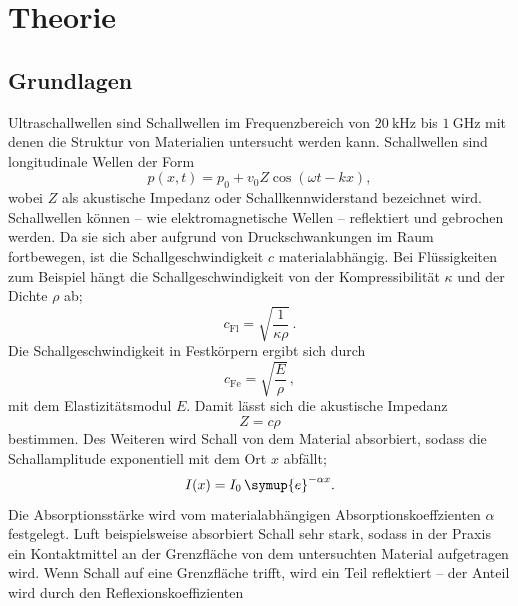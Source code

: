\section{Theorie}
\label{sec:Theorie}
\subsection{Grundlagen}
Ultraschallwellen sind Schallwellen im Frequenzbereich von $\SI{20}{\kilo\hertz}$ bis
$\SI{1}{\giga\hertz}$ mit denen die Struktur von Materialien untersucht werden kann.
Schallwellen sind longitudinale Wellen der Form
\begin{equation}
	p(x,t) = p_0 + v_0 Z \cos(\omega t - kx) \mathrm{,}
\end{equation}
wobei $Z$ als akustische Impedanz oder Schallkennwiderstand bezeichnet wird.
Schallwellen können -- wie elektromagnetische Wellen -- reflektiert und gebrochen werden.
Da sie sich aber aufgrund von Druckschwankungen im Raum fortbewegen, ist die
Schallgeschwindigkeit $c$ materialabhängig. Bei Flüssigkeiten zum Beispiel hängt die
Schallgeschwindigkeit von der Kompressibilität $\kappa$ und der Dichte $\rho$ ab;
\begin{equation}
	c_{\mathrm{Fl}} = \sqrt{\frac{1}{\kappa\rho}} \, \mathrm{.}
\end{equation}
Die Schallgeschwindigkeit in Festkörpern ergibt sich durch
\begin{equation}
	c_{\mathrm{Fe}} = \sqrt{\frac{E}{\rho}} \, \mathrm{,}
\end{equation}
mit dem Elastizitätsmodul $E$.
Damit lässt sich die akustische Impedanz
\begin{equation}
	Z=c \rho
\end{equation}
bestimmen.
Des Weiteren wird Schall von dem Material absorbiert, sodass die Schallamplitude exponentiell
mit dem Ort $x$ abfällt;
\begin{equation}
	\label{eqn:dampf}
	I(x) = I_0 \, \symup{e}^{-\alpha x} \mathrm{.}
\end{equation}
Die Absorptionsstärke wird vom materialabhängigen Absorptionskoeffzienten $\alpha$ festgelegt.
Luft beispielsweise absorbiert Schall sehr stark, sodass in der Praxis ein Kontaktmittel an der
Grenzfläche von dem untersuchten Material aufgetragen wird.
Wenn Schall auf eine Grenzfläche trifft, wird ein Teil reflektiert -- der Anteil wird durch den
Reflexionskoeffizienten
